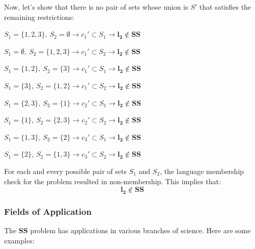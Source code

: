 \documentclass[../main]{subfiles}
\begin{document}
Now, let’s show that there is no pair of sets whose union is \( S' \) that satisfies the remaining restrictions:

\begin{center}
$S_1 = \{1, 2, 3\}, \ S_2 = \emptyset \rightarrow c_1' \subset S_1 \rightarrow \textbf{l}_\textbf{2} \notin \textbf{SS}$
\end{center}
\begin{center}
$S_1 = \emptyset, \ S_2 = \{1, 2, 3\} \rightarrow c_1' \subset S_2 \rightarrow \textbf{l}_\textbf{2} \notin \textbf{SS}$
\end{center}
\begin{center}
$S_1 = \{1, 2\}, \ S_2 = \{3\} \rightarrow c_1' \subset S_1 \rightarrow \textbf{l}_\textbf{2} \notin \textbf{SS}$
\end{center}
\begin{center}
$S_1 = \{3\}, \ S_2 = \{1, 2\} \rightarrow c_1' \subset S_2 \rightarrow \textbf{l}_\textbf{2} \notin \textbf{SS}$
\end{center}
\begin{center}
$S_1 = \{2, 3\}, \ S_2 = \{1\} \rightarrow c_2' \subset S_1 \rightarrow \textbf{l}_\textbf{2} \notin \textbf{SS}$
\end{center}
\begin{center}
$S_1 = \{1\}, \ S_2 = \{2, 3\} \rightarrow c_2' \subset S_2 \rightarrow \textbf{l}_\textbf{2} \notin \textbf{SS}$
\end{center}
\begin{center}
$S_1 = \{1, 3\}, \ S_2 = \{2\} \rightarrow c_3' \subset S_1 \rightarrow \textbf{l}_\textbf{2} \notin \textbf{SS}$
\end{center}
\begin{center}
$S_1 = \{2\}, \ S_2 = \{1, 3\} \rightarrow c_3' \subset S_2 \rightarrow \textbf{l}_\textbf{2} \notin \textbf{SS}$
\end{center}

For each and every possible pair of sets \( S_1 \) and \( S_2 \), the language membership check for the problem resulted in non-membership. This implies that:
\begin{equation*}
    \textbf{l}_\textbf{2} \notin \textbf{SS}
\end{equation*}
\subsubsection{Fields of Application}
The \textbf{SS} problem has applications in various branches of science. Here are some examples:
\end{document}

